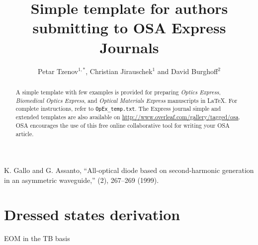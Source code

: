 \documentclass[10pt,letterpaper]{article}
\begin{document}
	
	\title{Simple template for authors submitting to OSA Express Journals}
	
	\author{Petar Tzenov$^{1,*}$, Christian Jirauschek$^1$ and David Burghoff$^{2}$}
	
	\address{$^1$ Institute for Nanoelectronics, Technische Universit\''at M\''unchen, D-80333 Munich, Germany}
	\address{$^2$ Somewhere in MIT, US}
	
	
	
	
	\begin{abstract}
		A simple template with few examples is provided for preparing \textit{Optics Express}, \textit{Biomedical Optics Express}, and \textit{Optical Materials Express} manuscripts in \LaTeX. For complete instructions, refer to \texttt{OpEx\_temp.txt}. The Express journal simple and extended templates are also available on \url{http://www.overleaf.com/gallery/tagged/osa}. OSA encourages the use of this free online collaborative tool for writing your OSA article.
	\end{abstract}
	
	
	\begin{thebibliography}{99}
		
		 K. Gallo and G. Assanto, ``All-optical diode based on second-harmonic generation in an asymmetric waveguide,'' (2), 267--269 (1999).
	\end{thebibliography}
	
	\section{Dressed states derivation}
	
	EOM in the TB basis
	
\end{document}
